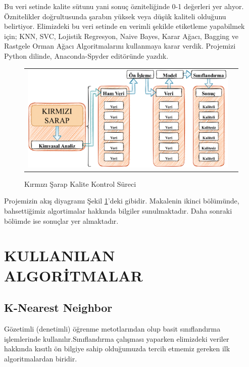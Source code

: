 \documentclass[conference]{IEEEtran}
\begin{document}
\quad Bu veri setinde kalite sütunu yani sonuç özniteliğinde 0-1 değerleri yer alıyor. Öznitelikler doğrultusunda şarabın yüksek veya düşük kaliteli olduğunu belirtiyor. Elimizdeki bu veri setinde en verimli şekilde etiketleme yapabilmek için; KNN, SVC, Lojistik Regresyon, Naive Bayes, Karar Ağacı, Bagging ve Rastgele Orman Ağacı Algoritmalarını kullanmaya karar verdik. Projemizi Python dilinde, Anaconda-Spyder editöründe yazdık.
\pagebreak
\begin{figure}[!h]
	\centering%
	\begin{center}
		\begin{tabular}{cc}%
			\includegraphics[scale=0.2]{pictures/pic_01.png}&%
		\end{tabular}%
	\end{center}
	\caption{Kırmızı Şarap Kalite Kontrol Süreci}%
	\label{fig:01}
\end{figure}

Projemizin akış diyagramı Şekil \ref{fig:01}'deki gibidir. Makalenin ikinci bölümünde, bahsettiğimiz algortimalar hakkında bilgiler sunulmaktadır. Daha sonraki bölümde ise sonuçlar yer almaktadır.


\section{\textbf{KULLANILAN ALGORİTMALAR}}
\subsection{\textbf{K-Nearest Neighbor}}
\quad Gözetimli (denetimli) öğrenme metotlarından olup  basit sınıflandırma işlemlerinde kullanılır\cite{8}\cite{9}.Sınıflandırma çalışması yaparken elimizdeki veriler hakkında kısıtlı ön bilgiye sahip olduğumuzda tercih etmemiz gereken ilk algoritmalardan biridir\cite{8}.
\end{document}
